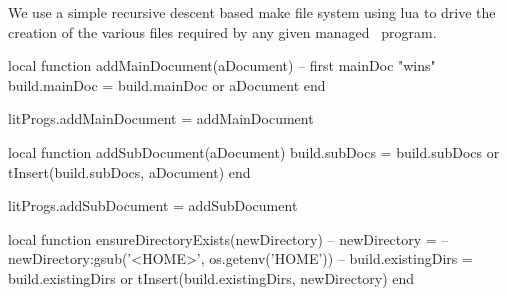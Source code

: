 
\startchapter[title=Lua Make System Files]

We use a simple recursive descent based make file system using lua to 
drive the creation of the various files required by any given 
 managed \ConTeXt\ program. 

\startMkIVCode
\def\addMainDocument#1{
  \directlua{
    thirddata.literateProgs.addMainDocument('#1')
  }
}

\def\addSubDocument#1{
  \directlua{
    thirddata.literateProgs.addSubDocument('#1')
  }
}

\def\ensureDirectoryExists#1{
  \directlua{
    thirddata.literateProgs.ensureDirectoryExists('#1')
  }
}

\def\addDocumentDirectory#1{
  \directlua{
    thirddata.literateProgs.addDocumentDirectory('#1')
  }
}

\def\addLmsfileSubDirectory#1{
  \directlua{
    thirddata.literateProgs.addLmsfileSubDirectory('#1')
  }
}

\def\addConTeXtModuleFile#1{
  \directlua{
    thirddata.literateProgs.addConTeXtModuleFile('#1')
  }
}

\def\addConTeXtModuleDirectory#1{
  \directlua{
    thirddata.literateProgs.addConTeXtModuleDirectory('#1')
  }
}

\def\addCCodeProgram#1{
  \directlua{
    thirddata.literateProgs.addCCodeProgram('#1')
  }
}

\def\addCCodeLibDirectory#1{
  \directlua{
    thirddata.literateProgs.addCCodeLibDirectory('#1')
  }
}

\def\addCCodeLib#1{
  \directlua{
    thirddata.literateProgs.addCCodeLib('#1')
  }
}

\def\addCCodeTargets#1{
  \directlua{
    thirddata.literateProgs.addCCodeTargets('#1')
  }
}
\stopMkIVCode

\startLuaCode
local function addMainDocument(aDocument)
  -- first mainDoc "wins"
  build.mainDoc = build.mainDoc or aDocument
end

litProgs.addMainDocument = addMainDocument

local function addSubDocument(aDocument)
  build.subDocs = build.subDocs or { }
  tInsert(build.subDocs, aDocument)
end

litProgs.addSubDocument = addSubDocument

local function ensureDirectoryExists(newDirectory)
--  newDirectory =
--    newDirectory:gsub('<HOME>', os.getenv('HOME'))
--  build.existingDirs = build.existingDirs or { }
  tInsert(build.existingDirs, newDirectory)
end

